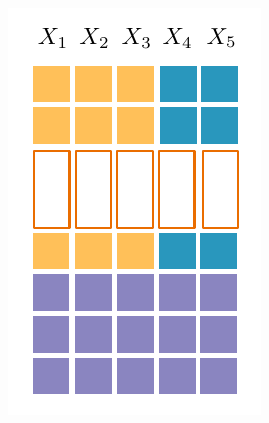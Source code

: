 \documentclass[final]{beamer}
\begin{document}
\begin{frame}{}
\begin{textblock}{80}
\begin{minipage}[t]{5.1516cm}
    \includegraphics[width=\linewidth]{figures/grid-3}                                                               \end{minipage}\hspace{30pt}
    

\end{textblock}
\end{frame}
\end{document}
